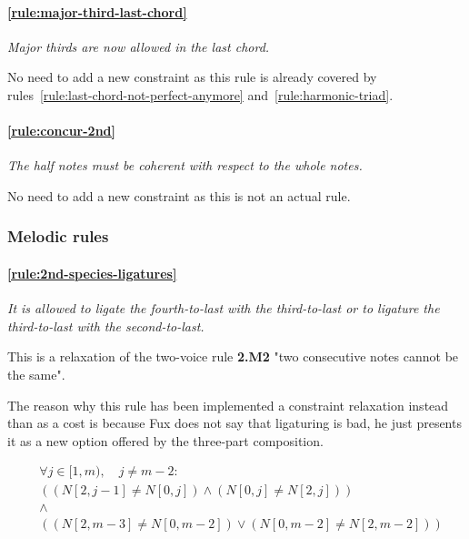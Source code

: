 \paragraph{\hspace{.5cm}\ref{rule:major-third-last-chord}} \textit{Major thirds are now allowed in the last chord.}

No need to add a new constraint as this rule is already covered by rules~\ref{rule:last-chord-not-perfect-anymore} and~\ref{rule:harmonic-triad}.

\paragraph{\hspace{.5cm}\ref{rule:concur-2nd}} \textit{The half notes must be coherent with respect to the whole notes.}

No need to add a new constraint as this is not an actual rule.

\subsubsection{Melodic rules}

    \paragraph{\hspace{.6cm}\ref{rule:2nd-species-ligatures}} \greendots \textit{It is allowed to ligate the fourth-to-last with the third-to-last or to ligature the third-to-last with the second-to-last.}  

    This is a relaxation of the two-voice rule \textbf{2.M2} "two consecutive notes cannot be the same".
    
    The reason why this rule has been implemented a constraint relaxation instead than as a cost is because Fux does not say that ligaturing is bad, he just presents it as a new option offered by the three-part composition.

    \begin{equation}
        \begin{aligned}
            &\forall j \in [1, m), \quad j \neq m-2:\\
            &((N[2, j-1] \neq N[0, j]) \land (N[0, j] \neq N[2, j])) \\
            &\land \\
            & ((N[2, m-3] \neq N[0, m-2]) \lor (N[0, m-2] \neq N[2, m-2]) )
        \end{aligned}
    \end{equation}

